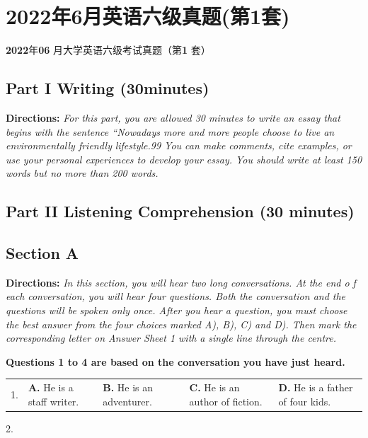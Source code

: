 \documentclass[UTF8,11pt]{ctexart}
\begin{document}
\section*{2022年6月英语六级真题(第1套)}
\textbf{2022}年\textbf{06} 月大学英语六级考试真题（第\textbf{1} 套）


\subsection*{\textbf{Part I} \textbf{Writing} \textbf{(30minutes)}}


\textbf{Directions: }\textit{For this part, you are allowed 30 minutes to write an essay that begins with the} \textit{sentence “Nowadays more and more people choose to live an environmentally friendly} \textit{lifestyle.99 You can make comments, cite examples, or use your personal experiences to develop} \textit{your essay. You should write at least 150 words but no more than 200 words.}


\subsection*{\textbf{Part II} \textbf{Listening Comprehension} \textbf{(30 minutes)}}


\subsection*{\textbf{Section A}}


\textbf{Directions: }\textit{In this section, you will hear two long conversations. At the end o f each} \textit{conversation, you will hear four questions. Both the conversation and the questions will be} \textit{spoken only once. After you hear a question, you must choose the best answer from the four} \textit{choices marked A), B), C) and D). Then mark the corresponding letter on Answer Sheet 1 with} \textit{a single line through the centre.}


\textbf{Questions 1 to 4 are based on the conversation you have just heard.}


\noindent\begin{tabularx}{\linewidth}{@{}lXXXX@{}}1. & \textbf{A.} He is a staff writer. & \textbf{B.} He is an adventurer. & \textbf{C.} He is an author of fiction. & \textbf{D.} He is a father of four kids.\\\end{tabularx}\par

2.
\end{document}
